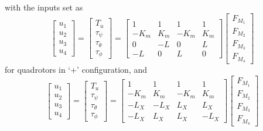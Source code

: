 with the inputs set as
\begin{equation}
\begin{bmatrix}
u_1 \\[5pt] u_2 \\[5pt] u_3 \\[5pt] u_4
\end{bmatrix} = \begin{bmatrix}
	T_u\\[5pt]
	\tau_{\psi}\\[5pt]
	\tau_{\theta}\\[5pt]
	\tau_{\phi}
	\end{bmatrix} = \begin{bmatrix}
	1 & 1 & 1 & 1 \\[5pt]
	-K_{m} & K_{m} & -K_{m} & K_{m}\\[5pt]
	0 & -L & 0 & L\\[5pt]
	-L & 0 & L & 0
							\end{bmatrix}
\begin{bmatrix}
F_{M_1}\\[5pt]
F_{M_2}\\[5pt]
F_{M_3}\\[5pt]
F_{M_4}
\end{bmatrix}					
\end{equation}
for quadrotors in `+' configuration, and
\begin{equation}
\begin{bmatrix}
u_1 \\[5pt] u_2 \\[5pt] u_3 \\[5pt] u_4
\end{bmatrix}	 = \begin{bmatrix}
	T_u\\[5pt]
	\tau_{\psi}\\[5pt]
	\tau_{\theta}\\[5pt]
	\tau_{\phi}
	\end{bmatrix} = \begin{bmatrix}
	1 & 1 & 1 & 1 \\[5pt]
	-K_{m} & K_{m} & -K_{m} & K_{m}\\[5pt]
	-L_{X} & -L_{X} & L_{X} & L_{X}\\[5pt]
	-L_{X} & L_{X} & L_{X} & -L_{X}
							\end{bmatrix}
\begin{bmatrix}
F_{M_1}\\[5pt]
F_{M_2}\\[5pt]
F_{M_3}\\[5pt]
F_{M_4}
\end{bmatrix}
\end{equation}

